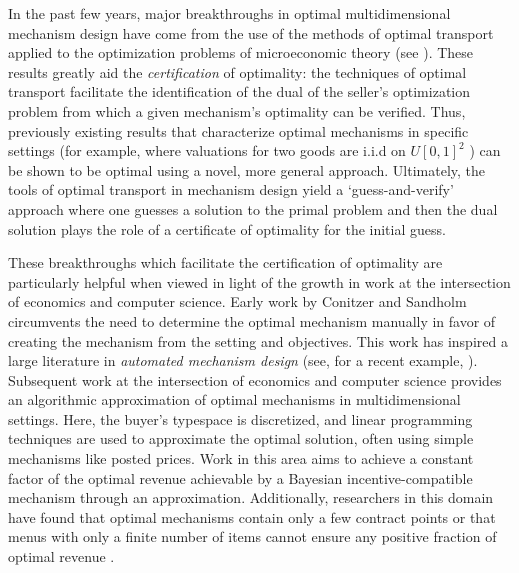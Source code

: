 In the past few years, major breakthroughs in optimal multidimensional mechanism design have come from the use of the methods of optimal transport applied to the optimization problems of microeconomic theory (see \cite{ekeland2010}). These results \autocite{daskalakis2017strong, kolesnikov2022} greatly aid the \textit{certification} of optimality: the techniques of optimal transport facilitate the identification of the dual of the seller's optimization problem from which a given mechanism's optimality can be verified. Thus, previously existing results that characterize optimal mechanisms in specific settings (for example, where valuations for two goods are i.i.d on $U[0,1]^2$ \autocite{pavlov2011optimal, manelli2006}) can be shown to be optimal using a novel, more general approach. Ultimately, the tools of optimal transport in mechanism design yield a `guess-and-verify' approach where one guesses a solution to the primal problem and then the dual solution plays the role of a certificate of optimality for the initial guess.

These breakthroughs which facilitate the certification of optimality are particularly helpful when viewed in light of the growth in work at the intersection of economics and computer science. Early work by Conitzer and Sandholm \autocite*{conitzer2002,conitzer2004} circumvents the need to determine the optimal mechanism manually in favor of creating the mechanism from the setting and objectives. This work has inspired a large literature in \textit{automated mechanism design} (see, for a recent example, \cite{dutting2024}). Subsequent work at the intersection of economics and computer science \autocite{chawla2007,cai2012,cai2016,belloni2010multidimensional,alaei2019efficient} provides an algorithmic approximation of optimal mechanisms in multidimensional settings. Here, the buyer's typespace is discretized, and linear programming techniques are used to approximate the optimal solution, often using simple mechanisms like posted prices. Work in this area aims to achieve a constant factor of the optimal revenue achievable by a Bayesian incentive-compatible mechanism through an approximation. Additionally, researchers in this domain have found that optimal mechanisms contain only a few contract points \autocite{wang2014optimal} or that menus with only a finite number of items cannot ensure any positive fraction of optimal revenue \autocite{hart2019}. 

